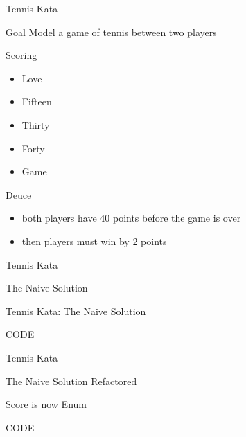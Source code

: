 \documentclass[aspectratio=169]{beamer}
\begin{document}
\begin{frame}{Tennis Kata}
\begin{block}{Goal}
Model a game of tennis between two players
\end{block}
\begin{block}{Scoring}
\begin{itemize}
\item Love
\item Fifteen
\item Thirty
\item Forty
\item Game
\end{itemize}
\end{block}
\begin{block}{Deuce}
\begin{itemize}
\item both players have 40 points before the game is over
\item then players must win by 2 points
\end{itemize}
\end{block}
\end{frame}

\begin{frame}{Tennis Kata}
\begin{center}
\begin{Huge}The Naive Solution\end{Huge}
\end{center}
\end{frame}

\begin{frame}{Tennis Kata: The Naive Solution}
\begin{center}
\begin{Huge}
CODE
\end{Huge}
\end{center}
\end{frame}

\begin{frame}{Tennis Kata}
\begin{center}
\begin{Huge}The Naive Solution Refactored\end{Huge}
\linebreak
\begin{Large}
Score is now Enum
\end{Large}
\end{center}
\end{frame}

\begin{frame}
\begin{center}
\begin{Huge}
CODE
\end{Huge}
\end{center}
\end{frame}
\end{document}
